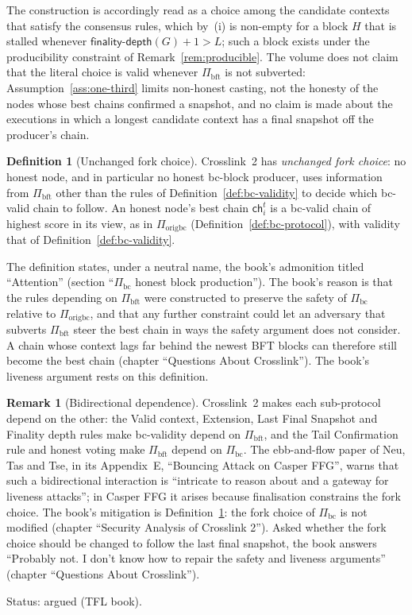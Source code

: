 \documentclass[11pt,a4paper]{article}
\theoremstyle{definition}
\newtheorem{definition}[theorem]{Definition}
\newtheorem{remark}[theorem]{Remark}
\newcommand{\bc}{\mathrm{bc}}
\newcommand{\bft}{\mathrm{bft}}
\newcommand{\ch}{\mathsf{ch}}
\newcommand{\Piorigbc}{\Pi_{\mathrm{origbc}}}
\newcommand{\Pibc}{\Pi_{\bc}}
\newcommand{\Pibft}{\Pi_{\bft}}
\newcommand{\finalitydepth}{\mathsf{finality\text{-}depth}}
\begin{document}
The construction is accordingly read as a choice among the candidate contexts
that satisfy the consensus rules, which by~(i) is non-empty for a block $H$
that is stalled whenever $\finalitydepth(G) + 1 > L$; such a block exists
under the producibility constraint of Remark~\ref{rem:producible}. The volume
does not claim that the literal choice is valid whenever $\Pibft$ is not
subverted: Assumption~\ref{ass:one-third} limits non-honest casting, not the
honesty of the nodes whose best chains confirmed a snapshot, and no claim is
made about the executions in which a longest candidate context has a final
snapshot off the producer's chain.

\begin{definition}[Unchanged fork choice]\label{def:fork-choice}
Crosslink~2 has \emph{unchanged fork choice}: no honest node, and in
particular no honest bc-block producer, uses information from $\Pibft$ other
than the rules of Definition~\ref{def:bc-validity} to decide which bc-valid
chain to follow. An honest node's best chain $\ch_i^t$ is a bc-valid chain of
highest score in its view, as in $\Piorigbc$ (Definition~\ref{def:bc-protocol}),
with validity that of Definition~\ref{def:bc-validity}.
\end{definition}

The definition states, under a neutral name, the book's admonition titled
``Attention'' (section ``$\Pibc$ honest block production''). The book's
reason is that the rules depending on $\Pibft$ were constructed to preserve
the safety of $\Pibc$ relative to $\Piorigbc$, and that any further
constraint could let an adversary that subverts $\Pibft$ steer the best
chain in ways the safety argument does not consider. A chain whose context
lags far behind the newest BFT blocks can therefore still become the best
chain (chapter ``Questions About Crosslink''). The book's liveness argument
rests on this definition.

\begin{remark}[Bidirectional dependence]\label{rem:bidirectional}
Crosslink~2 makes each sub-protocol depend on the other: the Valid context,
Extension, Last Final Snapshot and Finality depth rules make bc-validity
depend on $\Pibft$, and the Tail Confirmation rule and honest voting make
$\Pibft$ depend on $\Pibc$. The ebb-and-flow paper of Neu, Tas and Tse, in
its Appendix~E, ``Bouncing Attack on Casper FFG'', warns that such a
bidirectional interaction is ``intricate to reason about and a gateway for
liveness attacks''; in Casper FFG it arises because finalisation constrains
the fork choice. The book's mitigation is Definition~\ref{def:fork-choice}:
the fork choice of $\Pibc$ is not modified (chapter ``Security Analysis of
Crosslink 2''). Asked whether the fork choice should be changed to follow the
last final snapshot, the book answers ``Probably not. I don't know how to
repair the safety and liveness arguments'' (chapter ``Questions About
Crosslink'').

Status: argued (TFL book).
\end{remark}
\end{document}
